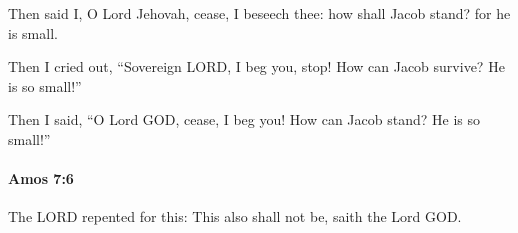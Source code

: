 			\begin{versebox}
					\item[BHS] 
					\item[LXX] 
					\item[ASV] Then said I, O Lord Jehovah, cease, I beseech thee: how shall Jacob stand? for he is small.
					\item[NIV] Then I cried out, “Sovereign LORD, I beg you, stop! How can Jacob survive? He is so small!”
					\item[NRSV] Then I said, “O Lord GOD, cease, I beg you! How can Jacob stand? He is so small!”
			\end{versebox}

		\paragraph{Amos 7:6} %
			\label{AMOS-7-6}

			The LORD repented for this: This also shall not be, saith the Lord GOD.

